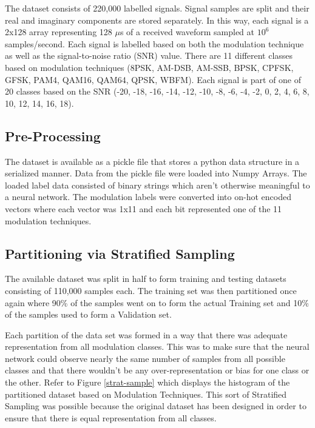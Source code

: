 \documentclass[journal,onecolumn]{IEEEtran}
\begin{document}
The dataset consists of 220,000 labelled signals. Signal samples are split and their real and imaginary components are stored separately. In this way, each signal is a 2x128 array representing 128 $\mu$s of a received waveform sampled at $10^{6}$ samples/second. Each signal is labelled based on both the modulation technique as well as the signal-to-noise ratio (SNR) value. There are 11 different classes based on modulation techniques  (8PSK, AM-DSB, AM-SSB, BPSK, CPFSK, GFSK, PAM4, QAM16, QAM64, QPSK, WBFM). Each signal is part of one of 20 classes based on the SNR (-20, -18, -16, -14, -12, -10, -8, -6, -4, -2, 0, 2, 4, 6, 8, 10, 12, 14, 16, 18).

\subsection{Pre-Processing}

The dataset is available as a pickle file that stores a python data structure in a serialized manner. Data from the pickle file were loaded into Numpy Arrays. The loaded label data consisted of binary strings which aren't otherwise meaningful to a neural network. The modulation labels were converted into on-hot encoded vectors where each vector was 1x11 and each bit represented one of the 11 modulation techniques.

\subsection{Partitioning via Stratified Sampling}

The available dataset was split in half to form training and testing datasets consisting of 110,000 samples each. The training set was then partitioned once again where 90\% of the samples went on to form the actual Training set and 10\% of the samples used to form a Validation set.

Each partition of the data set was formed in a way that there was adequate representation from all modulation classes. This was to make sure that the neural network could observe nearly the same number of samples from all possible classes and that there wouldn't be any over-representation or bias for one class or the other. Refer to Figure \ref{strat-sample} which displays the histogram of the partitioned dataset based on Modulation Techniques. This sort of Stratified Sampling \cite{stratSamp} was possible because the original dataset has been designed in order to ensure that there is equal representation from all classes.
\end{document}
